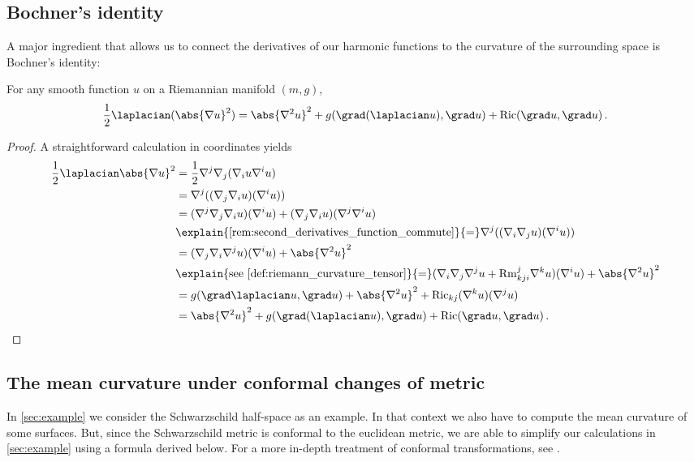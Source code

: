 \documentclass[titlepage,numbers=noenddot,oneside,%
cleardoublepage=empty,paper=a4,fontsize=11pt,%
english,%
]{scrartcl}
\newcommand*{\mathfullstop}{\,.}
\newcommand{\Ricci}{\mathrm{Ric}} %
\newcommand{\riemanncurvature}{\mathrm{Rm}} %
\begin{document}
\subsection{Bochner's identity}
A major ingredient that allows us to connect the derivatives of our harmonic functions to the curvature of the surrounding space is Bochner's identity:
\begin{lemma}\label{lem:bochner_identity}
    For any smooth function \( u \) on a Riemannian manifold \( (m,g) \),
    \begin{equation*}
        \frac{1}{2}\laplacian(\abs{\nabla u}^2)=\abs{\nabla^2 u}^2+g(\grad (\laplacian u),\grad u)+\Ricci(\grad u, \grad u)\mathfullstop
    \end{equation*} 
\end{lemma}
\begin{proof}
    A straightforward calculation in coordinates yields
    \begin{equation*}
        \begin{aligned}[t]
            \frac{1}{2}\laplacian \abs{\nabla u}^2&=\frac{1}{2}\nabla^j\nabla_j(\nabla_i u \nabla^i u)\\
            &=\nabla^j((\nabla_j \nabla_i u)(\nabla^i u))\\
            &=(\nabla^j \nabla_j\nabla_i u)(\nabla^i u)+(\nabla_j \nabla_i u)(\nabla^j \nabla^i u)\\
            &\explain{\text{\cref{rem:second_derivatives_function_commute}}}{=}\nabla^j((\nabla_i \nabla_j u)(\nabla^i u))\\
            &=(\nabla_j \nabla_i \nabla^j u)(\nabla^i u)+\abs{\nabla^2 u}^2\\
            &\explain{\text{see \cref{def:riemann_curvature_tensor}}}{=}(\nabla_i \nabla_j \nabla^j u+\riemanncurvature_{kji}^j \nabla^k u)(\nabla^i u)+\abs{\nabla^2 u}^2\\
            &=g(\grad \laplacian u,\grad u)+\abs{\nabla^2 u}^2+\Ricci_{kj}(\nabla^k u)(\nabla^j u)\\
            &=\abs{\nabla^2 u}^2+g(\grad (\laplacian u),\grad u)+\Ricci(\grad u, \grad u)\mathfullstop
        \end{aligned}
    \end{equation*}
\end{proof}
\subsection{The mean curvature under conformal changes of metric}\label{sec:conformal_changes_of_metric}
In \cref{sec:example} we consider the Schwarzschild half-space as an example. In that context we also have to compute the mean curvature of some surfaces. But, since the Schwarzschild metric is conformal to the euclidean metric, we are able to simplify our calculations in \cref{sec:example} using a formula derived below. For a more in-depth treatment of conformal transformations, see \cite{curryIntroductionConformalGeometry2015}.
\end{document}
